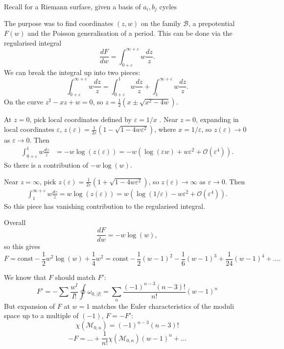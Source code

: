 Recall for a Riemann surface, given a basis of \(a_i,b_j\) cycles



The purpose was to find coordinates \( (z,w)\) on the family \( \mathcal{B}\), a prepotential \( F(w)\) and the Poisson generalisation of a period. This can be done via the regularised integral
\[ \frac{dF}{dw}= \int_{0+\varepsilon}^{\infty+\varepsilon} w \frac{dz}{z}.\] 
We can break the integral up into two pieces:
\[ \int_{0+\varepsilon}^{\infty+\varepsilon} w \frac{dz}{z} = \int_{0+\varepsilon}^1 w \frac{dz}{z} + \int_{1}^{\infty+\varepsilon} w \frac{dz}{z}. \]
On the curve \( z^2 - x z + w   = 0\), so \( z = \frac{1}{2}\left(x\pm \sqrt{x^2 - 4 w}\right)\).

At \(z=0\), pick local coordinates defined by \( \varepsilon = 1/x\) . Near \(z=0\), expanding in local coordinates \( \varepsilon\), \(z(\varepsilon) = \frac{1}{2 \varepsilon}\left(1 - \sqrt{1 - 4 w \varepsilon^2}\right)\), where \(x=1/\varepsilon\), so \( z(\varepsilon) \rightarrow 0 \) as \( \varepsilon \rightarrow 0\). Then
\begin{align*}
 \int_{0+\varepsilon}^{1}w \frac{dz}{z}  &= - w \log(z(\varepsilon)) = - w \left( \log(\varepsilon w) + w \varepsilon^2 + \mathcal{O}(\varepsilon^4) \right).
\end{align*}
So there is a contribution of  \( -w \log(w)\).

Near \( z = \infty\), pick \(z(\varepsilon) = \frac{1}{2 \varepsilon }\left(1+ \sqrt{1 - 4 w \varepsilon^2 }\right)\), so \( z(\varepsilon) \rightarrow \infty \) as \( \varepsilon \rightarrow 0\). Then
\begin{align*}
    \int^{\infty + \varepsilon}_{1} w \frac{dz}{z} = w \log(z(\varepsilon)) = w \left( \log(1/\varepsilon) - w \varepsilon^2 + \mathcal{O}(\varepsilon^4) \right).
\end{align*}
So this piece has vanishing contribution to the regularised integral. 

Overall
\[ \frac{dF}{dw} = -w \log(w) ,\]
so this gives 
\[ F = \mathrm{const} -\frac{1}{2} w^2 \log(w)  + \frac{1}{4} w^2 = \mathrm{const}  - \frac{1}{2} (w - 1)^2 - \frac{1}{6} (w - 1)^3 + \frac{1}{24} (w-1)^4 + \dots. \]

We know that \(F\) should match \(F'\):
\[ F' = - \sum \frac{w^I}{I!} \oint \omega_{0,|I|} = \sum_n \frac{(-1)^{n-3} (n-3)! }{n!} (w-1)^n \]
But expansion of \(F\) at \(w=1\) matches the Euler characteristics of the moduli space up to a multiple of \((-1)\), \(F=-F'\):
\[ \chi(\mathcal{M}_{0,n}) = (-1)^{n-3} (n-3)!\]
\[ -F = \dots + \frac{1}{n!} \chi(\mathcal{M}_{0,n})  (w-1)^n + \dots \]


